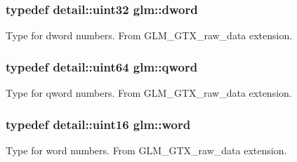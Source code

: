 \subsubsection[{dword}]{\setlength{\rightskip}{0pt plus 5cm}typedef {\bf detail\+::uint32} {\bf glm\+::dword}}\label{group__gtx__raw__data_ga1fc2589df6d44e923cd1820cf14805cf}
Type for dword numbers. From G\+L\+M\+\_\+\+G\+T\+X\+\_\+raw\+\_\+data extension. \hypertarget{group__gtx__raw__data_ga32447af289e879589883c9b7e3be1246}{}
\subsubsection[{qword}]{\setlength{\rightskip}{0pt plus 5cm}typedef detail\+::uint64 {\bf glm\+::qword}}\label{group__gtx__raw__data_ga32447af289e879589883c9b7e3be1246}
Type for qword numbers. From G\+L\+M\+\_\+\+G\+T\+X\+\_\+raw\+\_\+data extension. \hypertarget{group__gtx__raw__data_ga5617a479d471021b5c773c5e969ba46d}{}
\subsubsection[{word}]{\setlength{\rightskip}{0pt plus 5cm}typedef {\bf detail\+::uint16} {\bf glm\+::word}}\label{group__gtx__raw__data_ga5617a479d471021b5c773c5e969ba46d}
Type for word numbers. From G\+L\+M\+\_\+\+G\+T\+X\+\_\+raw\+\_\+data extension. 